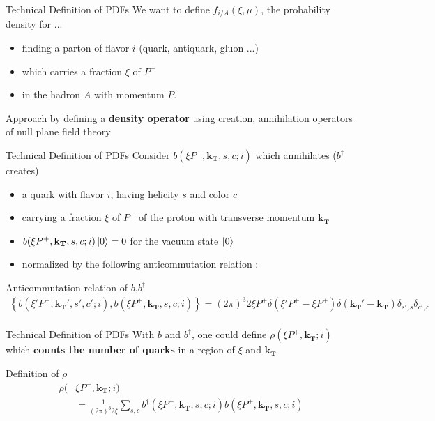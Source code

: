 \documentclass[aspectratio=169,xcolor=dvipsnames]{beamer}
\begin{document}
\begin{frame}{Technical Definition of PDFs}
	We want to define $f_{i/A}(\xi,\mu)$, the probability density for ... \vskip0.1in
	\begin{itemize}
		\item finding a parton of flavor $i$ (quark, antiquark, gluon ...) 
		\item which carries a fraction $\xi$ of $P^+$
		\item in the hadron $A$ with momentum $P$.
	\end{itemize}\vskip0.15in
	\MVRightArrow{} Approach by defining a \textbf{density operator} using creation, annihilation operators of null plane field theory
\end{frame}

\begin{frame}{Technical Definition of PDFs}
	Consider $b(\xi P^+, \mathbf{k_T},s,c;i)$ which annihilates ($b^\dagger$ creates)
	\begin{itemize}
		\item a quark with flavor $i$, having helicity $s$ and color $c$
		\item carrying a fraction $\xi$ of $P^+$ of the proton with transverse momentum $\mathbf{k_T}$
		\item $b(\xi P^+, \mathbf{k_T},s,c;i) \ket{0} = 0$ for the vacuum state $\ket{0}$
		\item normalized by the following anticommutation relation :
	\end{itemize}\vskip0.1in
	\begin{block}{Anticommutation relation of $b$,$b^\dagger$}
		\begin{align*}
			   \left\{ b(\xi' P^+, \mathbf{k_T'},s',c';i),b(\xi P^+, \mathbf{k_T},s,c;i)\right\}   = (2\pi)^3 2\xi P^+ \delta(\xi'P^+ - \xi P^+)\delta(\mathbf{k_T'}-\mathbf{k_T})\delta_{s',s} \delta_{c',c} \\
		\end{align*}
	\end{block}
\end{frame}

\begin{frame}{Technical Definition of PDFs}
	With $b$ and $b^\dagger$, one could define $\rho(\xi P^+,\mathbf{k_T};i)$ which \textbf{counts the number of quarks} in  a region of $\xi$ and $\mathbf{k_T}$\vskip0.1in
	\begin{block}{Definition of $\rho$}
		\begin{align*}
		\rho(&\xi P^+,\mathbf{k_T};i)  \\
		&= \frac{1}{(2\pi)^3 2\xi} \sum_{s,c}b^\dagger(\xi P^+, \mathbf{k_T},s,c;i)b(\xi P^+, \mathbf{k_T},s,c;i) \\
		\end{align*}
\end{block}
\end{frame}
\end{document}
